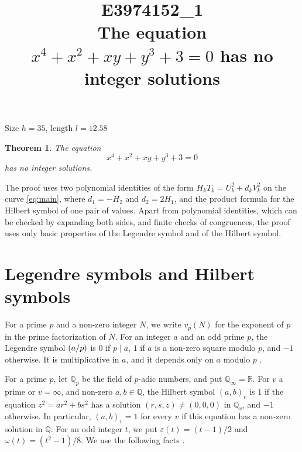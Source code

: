 \documentclass[11pt]{article}
\title{\textbf{E3974152\_1}\\[4pt] {\Large The equation $x^{4}+x^{2}+xy+y^{3}+3=0$ has no integer solutions}}
\author{}
\date{}
\newtheorem{theorem}{Theorem}
\newcommand{\Q}{\mathbb{Q}}
\newcommand{\leg}[2]{\mathchoice{\biggl(\dfrac{#1}{#2}\biggr)}{(#1/#2)}{(#1/#2)}{(#1/#2)}}
\begin{document}
\maketitle
\vspace{-8ex}
\begin{center}
Size $h=35$, length $l=12.58$
\end{center}

\begin{theorem}\label{thm:main}
The equation
\begin{equation}\label{eq:main}
x^{4}+x^{2}+xy+y^{3}+3=0
\end{equation}
has no integer solutions.
\end{theorem}

The proof uses two polynomial identities of the form $H_kT_k=U_k^2+d_kV_k^2$ on the curve \eqref{eq:main}, where $d_{1}=-H_{2}$ and $d_{2}=2H_{1}$, and the product formula for the Hilbert symbol of one pair of values. Apart from polynomial identities, which can be checked by expanding both sides, and finite checks of congruences, the proof uses only basic properties of the Legendre symbol and of the Hilbert symbol.

\section{Legendre symbols and Hilbert symbols}

For a prime $p$ and a non-zero integer $N$, we write $v_p(N)$ for the exponent of $p$ in the prime factorization of $N$. For an integer $a$ and an odd prime $p$, the Legendre symbol $\leg{a}{p}$ is $0$ if $p\mid a$, $1$ if $a$ is a non-zero square modulo $p$, and $-1$ otherwise. It is multiplicative in $a$, and it depends only on $a$ modulo $p$ \cite[Chapter~5]{IR}.

For a prime $p$, let $\Q_p$ be the field of $p$-adic numbers, and put $\Q_\infty=\mathbb R$. For $v$ a prime or $v=\infty$, and non-zero $a,b\in\Q$, the Hilbert symbol $(a,b)_v$ is $1$ if the equation $z^2=ar^2+bs^2$ has a solution $(r,s,z)\neq(0,0,0)$ in $\Q_v$, and $-1$ otherwise. In particular, $(a,b)_v=1$ for every $v$ if this equation has a non-zero solution in $\Q$. For an odd integer $t$, we put $\varepsilon(t)=(t-1)/2$ and $\omega(t)=(t^2-1)/8$. We use the following facts \cite[Chapter~III, Proposition~2 and Theorems~1 and~3]{Se}.
\end{document}
